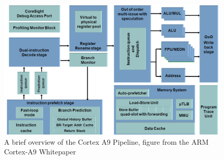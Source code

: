 \begin{figure}
    \centering
    \includegraphics[width=\textwidth]{figs/A9-Pipeline-hres.jpg}
    \caption{A brief overview of the Cortex A9 Pipeline, figure from the ARM Cortex-A9 Whitepaper \cite{a9whitepaper}}
    \label{fig:a9arch}
\end{figure}
